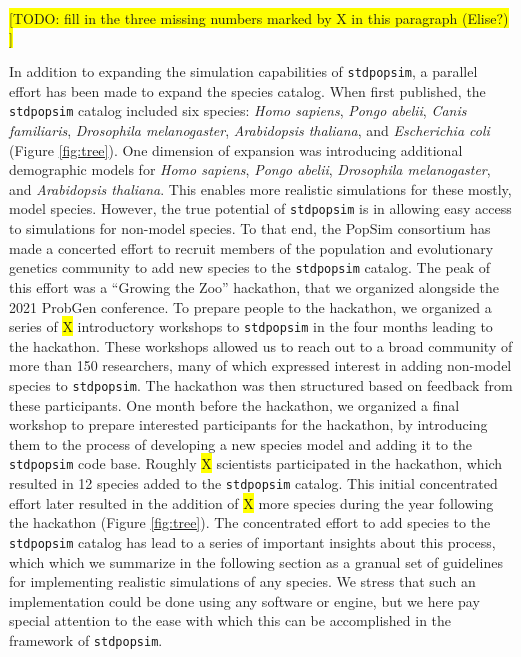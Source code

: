 \documentclass[hidelinks]{article}
\newcommand{\stdpopsim}{\texttt{stdpopsim}\xspace}
\begin{document}
\colorbox{yellow}{[TODO: fill in the three missing numbers marked by X in this paragraph (Elise?) ]}

In addition to expanding the simulation capabilities of \stdpopsim, 
a parallel effort has been made to expand the species catalog. 
When first published, the \stdpopsim catalog included six species:
\emph{Homo sapiens}, \emph{Pongo abelii}, \emph{Canis familiaris}, \emph{Drosophila melanogaster},
\emph{Arabidopsis thaliana}, and \emph{Escherichia coli} (Figure \ref{fig:tree}).
One dimension of expansion was introducing additional demographic models
for \emph{Homo sapiens}, \emph{Pongo abelii}, \emph{Drosophila melanogaster},
and \emph{Arabidopsis thaliana}. This enables more realistic simulations for these 
mostly, model species. 
However, the true potential of \stdpopsim is in allowing easy access to simulations
for non-model species. To that end, the PopSim consortium has made a concerted
effort to recruit members of the population and evolutionary genetics community
to add new species to the \stdpopsim catalog. The peak of this effort was a
``Growing the Zoo'' hackathon, that we organized alongside the 2021 ProbGen conference.
To prepare people to the hackathon, we organized a series of \colorbox{yellow}{X} 
introductory workshops to \stdpopsim in the four months leading to the hackathon.
These workshops allowed us to reach out to a broad community of more than 150 researchers,
many of which expressed interest in adding non-model species to \stdpopsim. 
The hackathon was then structured based on feedback from these participants.
One month before the hackathon, we organized a final workshop to prepare interested
participants for the hackathon, by introducing them to  the process of developing
a new species model and adding it to the \stdpopsim code base. 
Roughly \colorbox{yellow}{X} scientists participated in the hackathon,
which resulted in 12 species added to the \stdpopsim catalog.
This initial concentrated effort later resulted in the addition
of \colorbox{yellow}{X} more species during the year following the hackathon (Figure \ref{fig:tree}).
The concentrated effort to add species to the \stdpopsim catalog
has lead to a series of important insights about this process,
which which we summarize in the following section as a granual set of guidelines
for implementing realistic simulations of any species. We stress that such
an implementation could be done using any software or engine, but we
here pay special attention to the ease with which this can be accomplished
in the framework of \stdpopsim.
\end{document}
